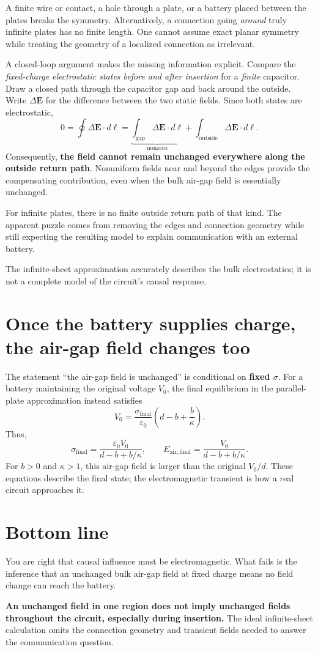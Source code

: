 \documentclass[11pt,letterpaper]{article}
\begin{document}
A finite wire or contact, a hole through a plate, or a battery placed between the
plates breaks the symmetry. Alternatively, a connection going \emph{around}
truly infinite plates has no finite length. One cannot assume exact planar
symmetry while treating the geometry of a localized connection as irrelevant.

A closed-loop argument makes the missing information explicit. Compare the
\emph{fixed-charge electrostatic states before and after insertion} for a
\emph{finite} capacitor. Draw a closed path through the capacitor gap and back
around the outside. Write $\Delta\mathbf{E}$ for the difference between the two
static fields. Since both states are electrostatic,
\[
    0=\oint\Delta\mathbf{E}\cdot d\boldsymbol{\ell}
    =\underbrace{\int_{\mathrm{gap}}
        \Delta\mathbf{E}\cdot d\boldsymbol{\ell}}_{\text{nonzero}}
    +\int_{\mathrm{outside}}\Delta\mathbf{E}\cdot d\boldsymbol{\ell}.
\]
Consequently, \textbf{the field cannot remain unchanged everywhere along the
outside return path}. Nonuniform fields near and beyond the edges provide the
compensating contribution, even when the bulk air-gap field is essentially
unchanged.

For infinite plates, there is no finite outside return path of that kind. The
apparent puzzle comes from removing the edges and connection geometry while
still expecting the resulting model to explain communication with an external
battery.

The infinite-sheet approximation accurately describes the bulk electrostatics;
it is not a complete model of the circuit's causal response.

\section{Once the battery supplies charge, the air-gap field changes too}

The statement ``the air-gap field is unchanged'' is conditional on
\textbf{fixed $\sigma$}. For a battery maintaining the original voltage $V_0$,
the final equilibrium in the parallel-plate approximation instead satisfies
\[
    V_0=\frac{\sigma_{\mathrm{final}}}{\varepsilon_0}
        \left(d-b+\frac{b}{\kappa}\right).
\]
Thus,
\[
    \sigma_{\mathrm{final}}
    =\frac{\varepsilon_0 V_0}{d-b+b/\kappa},
    \qquad
    E_{\mathrm{air,final}}
    =\frac{V_0}{d-b+b/\kappa}.
\]
For $b>0$ and $\kappa>1$, this air-gap field is larger than the original $V_0/d$.
These equations describe the final state; the electromagnetic transient is how
a real circuit approaches it.

\section*{Bottom line}

You are right that causal influence must be electromagnetic. What fails is the
inference that an unchanged bulk air-gap field at fixed charge means no field
change can reach the battery.

\textbf{An unchanged field in one region does not imply unchanged fields
throughout the circuit, especially during insertion.} The ideal infinite-sheet
calculation omits the connection geometry and transient fields needed to answer
the communication question.
\end{document}
